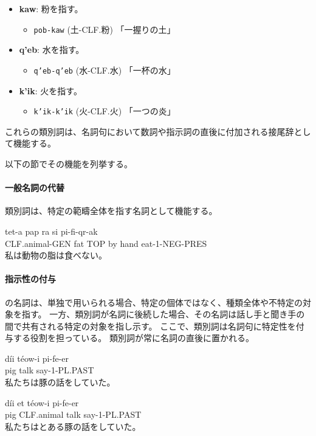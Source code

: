 \begin{itemize}
\begin{itemize}
            \item \textbf{kaw}: 粉を指す。
                \begin{itemize}
                    \item \texttt{pob-kaw} (土-CLF.粉) %
                    \quad 「一握りの土」
                \end{itemize}
            \item \textbf{q'eb}: 水を指す。%
                \begin{itemize}
                    \item \texttt{q'eb-q'eb} (水-CLF.水)
                    \quad 「一杯の水」
                \end{itemize}
            \item \textbf{k'ik}: 火を指す。%
                \begin{itemize}
                    \item \texttt{k'ik-k'ik} (火-CLF.火)
                    \quad 「一つの炎」
                \end{itemize}
        \end{itemize}
\end{itemize}
これらの類別詞は、名詞句において数詞や指示詞の直後に付加される接尾辞として機能する。

以下の節でその機能を列挙する。

\paragraph{一般名詞の代替}
類別詞は、特定の範疇全体を指す名詞として機能する。
\begin{exe}
\ex \gll tet-a pap ra si pi-fi-qr-ak\\
        CLF.animal-GEN fat TOP by hand eat-1-NEG-PRES\\
\glt 私は動物の脂は食べない。
\end{exe}

\paragraph{指示性の付与}

\langname の名詞は、単独で用いられる場合、特定の個体ではなく、種類全体や不特定の対象を指す。
一方、類別詞が名詞に後続した場合、その名詞は話し手と聞き手の間で共有される特定の対象を指し示す。
ここで、類別詞は名詞句に特定性を付与する役割を担っている。
類別詞が常に名詞の直後に置かれる。
\begin{exe}
\ex \gll d\'ii t\'eow-i pi-fe-er\\
pig talk say-1-PL.PAST \\
\glt 私たちは豚の話をしていた。
\end{exe}
\begin{exe}
\ex \gll d\'ii et t\'eow-i pi-fe-er\\
pig CLF.animal talk say-1-PL.PAST \\
\glt 私たちはとある豚の話をしていた。
\end{exe}

